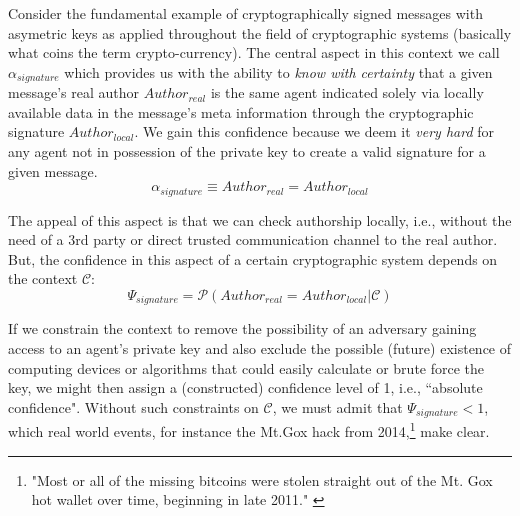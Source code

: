 \documentclass[twocolumn,showpacs,%
  nofootinbib,aps,superscriptaddress,%
  eqsecnum,prd,notitlepage,showkeys,10pt]{revtex4-1}
\begin{document}
Consider the fundamental example of cryptographically signed messages with asymetric keys as applied throughout the field of cryptographic systems (basically what coins the term crypto-currency). The central aspect in this context
we call $\alpha_{signature}$ which provides us with the ability to \textit{know with certainty} that a given message's real author $Author_{real}$ is the same agent indicated solely via locally available data in the message's meta information through the cryptographic signature $Author_{local}$. We gain this confidence because we deem it \textit{very hard} for any agent not in possession of the private key to create a valid signature for a given message.
\begin{equation}
\alpha_{signature} \equiv Author_{real} = Author_{local}
\end{equation}

The appeal of this aspect is that we can check authorship locally, i.e., without the need of a 3rd party or direct trusted communication channel to the real author.
But, the confidence in this aspect of a certain cryptographic system depends on the context $\mathcal{C}$:
\begin{equation}
\Psi_{signature} = \mathcal{P}(Author_{real} = Author_{local} | \mathcal{C})
\end{equation}

If we constrain the context to remove the possibility of an adversary gaining access to an agent's private key and also exclude the possible (future) existence of computing devices or algorithms that could easily calculate or brute force the key, we might then assign a (constructed) confidence level of 1, i.e., ``absolute confidence". Without such constraints on $\mathcal{C}$, we must admit that $\Psi_{signature}<1$, which real world events, for instance the Mt.Gox hack from 2014,\footnote{"Most or all of the missing bitcoins were stolen straight out of the Mt. Gox hot wallet over time, beginning in late 2011." \cite{mt-gox}} make clear.
\end{document}
